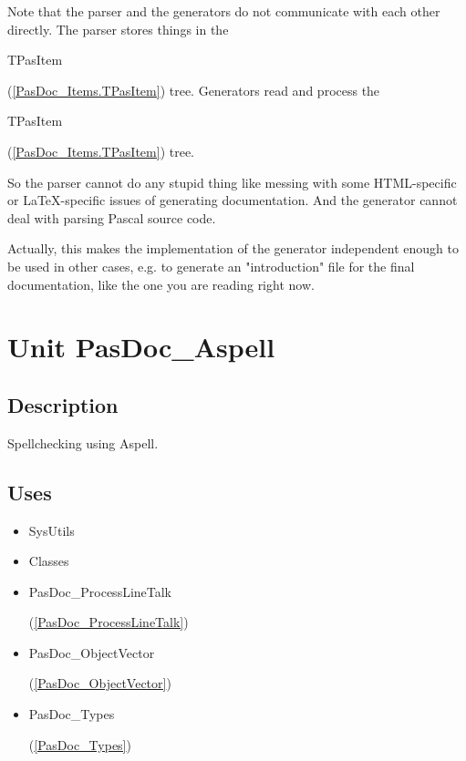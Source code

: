 \documentclass{report}
\begin{document}
Note that the parser and the generators do not communicate with each other directly. The parser stores things in the \begin{ttfamily}TPasItem\end{ttfamily}(\ref{PasDoc_Items.TPasItem}) tree. Generators read and process the \begin{ttfamily}TPasItem\end{ttfamily}(\ref{PasDoc_Items.TPasItem}) tree.

So the parser cannot do any stupid thing like messing with some HTML{-}specific or LaTeX{-}specific issues of generating documentation. And the generator cannot deal with parsing Pascal source code.

Actually, this makes the implementation of the generator independent enough to be used in other cases, e.g. to generate an "introduction" file for the final documentation, like the one you are reading right now.\chapter{Unit PasDoc{\_}Aspell}
\label{PasDoc_Aspell}
\section{Description}
Spellchecking using Aspell.
\section{Uses}
\begin{itemize}
\item \begin{ttfamily}SysUtils\end{ttfamily}\item \begin{ttfamily}Classes\end{ttfamily}\item \begin{ttfamily}PasDoc{\_}ProcessLineTalk\end{ttfamily}(\ref{PasDoc_ProcessLineTalk})\item \begin{ttfamily}PasDoc{\_}ObjectVector\end{ttfamily}(\ref{PasDoc_ObjectVector})\item \begin{ttfamily}PasDoc{\_}Types\end{ttfamily}(\ref{PasDoc_Types})\end{itemize}
\end{document}
